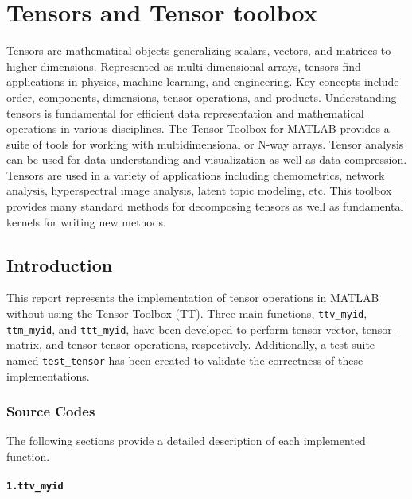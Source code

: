 \chapter{Tensors and Tensor toolbox}
Tensors are mathematical objects generalizing scalars, vectors, and matrices to higher dimensions. Represented as multi-dimensional arrays, tensors find applications in physics, machine learning, and engineering. Key concepts include order, components, dimensions, tensor operations, and products. Understanding tensors is fundamental for efficient data representation and mathematical operations in various disciplines.
\newline
The Tensor Toolbox for MATLAB provides a suite of tools for working with multidimensional or N-way arrays. Tensor analysis can be used for data understanding and visualization as well as data compression. Tensors are used in a variety of applications including chemometrics, network analysis, hyperspectral image analysis, latent topic modeling, etc. This toolbox provides many standard methods for decomposing tensors as well as fundamental kernels for writing new methods.
\section*{Introduction}

This report represents the implementation of tensor operations in MATLAB without using the Tensor Toolbox (TT). Three main functions, \texttt{ttv\_myid}, \texttt{ttm\_myid}, and \texttt{ttt\_myid}, have been developed to perform tensor-vector, tensor-matrix, and tensor-tensor operations, respectively. Additionally, a test suite named \texttt{test\_tensor} has been created to validate the correctness of these implementations.

\subsection*{Source Codes}

The following sections provide a detailed description of each implemented function.

\subsubsection*{\texttt{1.ttv\_myid}}


